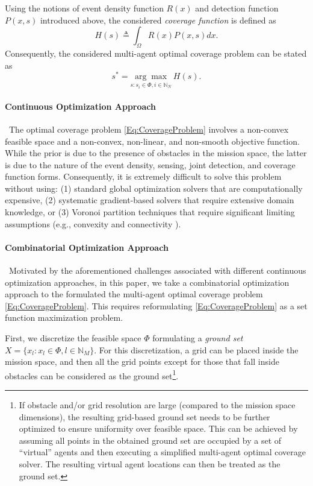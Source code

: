 \documentclass[letterpaper, 10 pt, conference]{ieeeconf}
\newcommand{\N}{\mathbb{N}}
\begin{document}
Using the notions of event density function $R(x)$ and detection function $P(x,s)$ introduced above, the considered \emph{coverage function} is defined as 
\begin{equation}\label{Eq:CoverageObjective}
H(s) \triangleq \int_\Omega R(x)P(x,s)dx.     
\end{equation}
Consequently, the considered multi-agent optimal coverage problem can be stated as
\begin{equation}\label{Eq:CoverageProblem}
 s^* = \underset{s:s_i\in \Phi, i\in \N_N}{\arg\max}\ H(s).  
\end{equation}

\paragraph*{Continuous Optimization Approach}\ 
The optimal coverage problem \eqref{Eq:CoverageProblem} involves a non-convex feasible space and a non-convex, non-linear, and non-smooth objective function. While the prior is due to the presence of obstacles in the mission space, the latter is due to the nature of the event density, sensing, joint detection, and coverage function forms. Consequently, it is extremely difficult to solve this problem without using: (1) standard global optimization solvers that are computationally expensive, (2) systematic gradient-based solvers that require extensive domain knowledge, or (3) Voronoi partition techniques that require significant limiting assumptions (e.g., convexity \cite{Yu2022} and connectivity \cite{Luo2019}).   

\paragraph*{Combinatorial Optimization Approach}\ Motivated by the aforementioned challenges associated with different continuous optimization approaches, in this paper, we take a combinatorial optimization approach to the formulated the multi-agent optimal coverage problem \eqref{Eq:CoverageProblem}. This requires reformulating \eqref{Eq:CoverageProblem} as a set function maximization problem.

First, we discretize the feasible space $\Phi$ formulating a \emph{ground set} $X = \{x_l:x_l\in \Phi, l\in\N_M\}$. For this discretization, a grid can be placed inside the mission space, and then all the grid points except for those that fall inside obstacles can be considered as the ground set\footnote{If obstacle and/or grid resolution are large (compared to the mission space dimensions), the resulting grid-based ground set needs to be further optimized to ensure uniformity over feasible space. This can be achieved by assuming all points in the obtained ground set are occupied by a set of ``virtual'' agents and then executing a simplified multi-agent optimal coverage solver. The resulting virtual agent locations can then be treated as the ground set.}.
\end{document}
